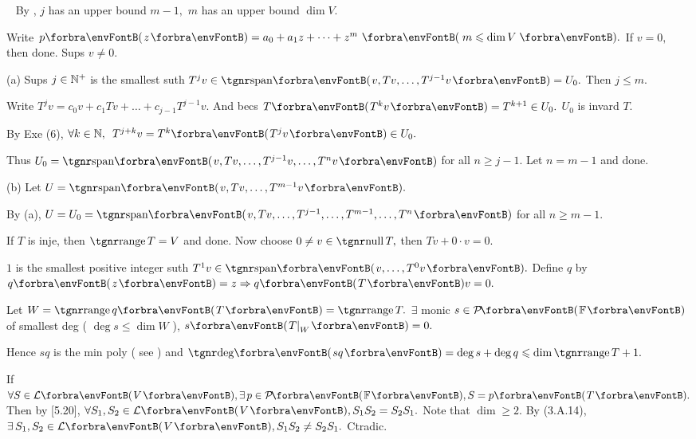 \par\quad
\Comment\,\,\, By \NOTEFOR [8.40], $j$ has an upper bound $m-1,$ $m$ has an upper bound $\dim V.$\par\quad
Write $p\Par{z}=a_0 +a_1 z+\dots+z^m \,\,\Par{\,m\leqslant \dim V\,}.$ If $v=0,$ then done. Sups $v\neq 0.$\par\quad
(a) Sups $j\in{\mathbb{N}^+}$ is the smallest suth $T^j v\in\Span{v,Tv,\dots,T^{j-1}v}=U_0.$ Then $j\leqslant m.$\par\quad\Ha
Write $T^j v=c_0 v+c_1 Tv+\dots+c_{j-1}T^{j-1}v.$ And becs $T\Par{T^k v}=T^{k+1}\in U_0.$ $U_0$ is invard $T.$\par\quad\Ha
By Exe (6), $\forall k\in\Nbb,\,\,\,T^{j+k}v=T^k\Par{T^j v}\in U_0.$\par\quad\Ha
Thus $U_0=\Span{v,Tv,\dots,T^{j-1} v,\dots,T^n v}$ for all $n\geqslant j-1.$ Let $n=m-1$ and done.\par\quad
(b) Let $U=\Span{v,Tv,\dots,T^{m-1}v}.$\par\quad\Hb
By (a), $U=U_0=\Span{v,Tv,\dots,T^{j-1},\dots,T^{m-1},\dots,T^n}$ for all $n\geqslant m-1.$\PfEnd
\SepLine

\par\quad
If $T$ is inje, then $\range T=V$ and done. Now choose $0\neq v\in\null T,$ then $Tv+0\cdot v=0.$\par\quad
$1$ is the smallest positive integer suth $T^1 v\in\Span{v,\dots,T^0 v}.$ Define $q$ by $q\Par{z}=z\Rightarrow q\Par{T}v=0.$\par\quad
Let $W=\range q\Par{T}=\range T.$ $\exists$ monic $s\in\PoFi$ of smallest deg ( $\deg s\leqslant\dim W$ ), $s\Par{T\mmid_W}=0.$\par\quad
Hence $sq$ is the min poly ( see \NOTEFOR [8.40] ) and $\Deg\Par{sq}=\deg s+\deg q\leqslant\dim\range T+1.$\PfEnd
\SepLine

If $\forall S\in\Lm{V},\exists\,p\in\PoFi,S=p\Par{T}.$ Then by [5.20], $\forall S_1,S_2\in\Lm{V},S_1S_2=S_2S_1.$\parSol{}
Note that $\dim\geqslant 2.$ By (3.A.14), $\exists\,S_1,S_2\in\Lm{V},S_1S_2\neq S_2S_1.$ Ctradic.\PfEnd
\SepLine

